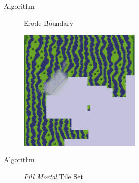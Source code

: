 \documentclass{beamer}
\begin{document}
  \begin{frame}[fragile]{Algorithm}

    \begin{figure}
      Erode Boundary

      \includegraphics[width=6cm]{img/fm_0036.pdf}
    \end{figure}
  \end{frame}

%


  \begin{frame}[fragile]{Algorithm}
    \begin{figure}
      \textit{Pill Mortal} Tile Set

    \end{figure}
  \end{frame}



\end{document}
